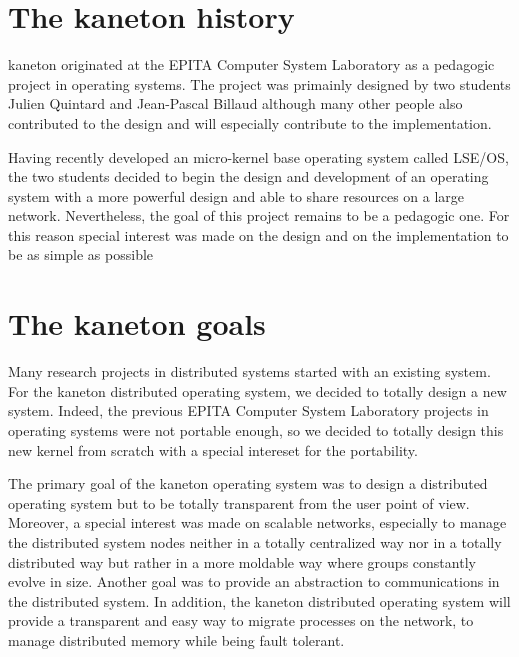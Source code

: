 \documentclass[10pt,a4wide]{article}
\begin{document}
\begin{multicols}{2}



\section{The kaneton history}

kaneton originated at the EPITA Computer System Laboratory as a pedagogic
project in operating systems. The project was primainly designed by two students
Julien Quintard and Jean-Pascal Billaud although many other people also
contributed to the design and will especially contribute to the implementation.

Having recently developed an micro-kernel base operating system called LSE/OS,
the two students decided to begin the design and development of an operating
system with a more powerful design and able to share resources on a large
network. Nevertheless, the goal of this project remains to be a pedagogic
one. For this reason special interest was made on the design and on the
implementation to be as simple as possible



\section{The kaneton goals}

Many research projects in distributed systems started with an existing system.
For the kaneton distributed operating system, we decided to totally design a
new system. Indeed, the previous EPITA Computer System Laboratory projects in
operating systems were not portable enough, so we decided to totally design
this new kernel from scratch with a special intereset for the portability.

The primary goal of the kaneton operating system was to design a distributed
operating system but to be totally transparent from the user point of view.
Moreover, a special interest was made on scalable networks, especially
to manage the distributed system nodes neither in a totally centralized way
nor in a totally distributed way but rather in a more moldable way where groups
constantly evolve in size. Another goal was to provide an abstraction to
communications in the distributed system. In addition, the kaneton distributed
operating system will provide a transparent and easy way to migrate processes
on the network, to manage distributed memory while being fault tolerant.


\end{multicols}
\end{document}
